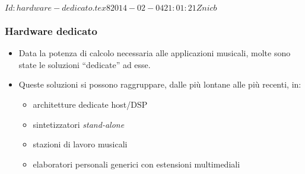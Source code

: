 %
%
%
%
%
\svnInfo $Id: hardware-dedicato.tex 8 2014-02-04 21:01:21Z nicb $

\setcounter{ms}{1}
\begin{frame}
    \frametitle{Hardware dedicato}

	\begin{itemize}[<+- | alert@+->]

		\item Data la potenza di calcolo necessaria
              alle applicazioni musicali,
              molte sono state le soluzioni ``dedicate'' ad esse.

		\item Queste soluzioni si possono raggruppare,
              dalle pi\`u lontane alle pi\`u recenti, in:

			  \begin{itemize}[<+- | alert@+->]

			  	\item architetture dedicate host/DSP

				\item sintetizzatori \emph{stand-alone}

				\item stazioni di lavoro musicali

				\item elaboratori personali generici
				      con estensioni multimediali

			  \end{itemize}

	\end{itemize}

\end{frame}



